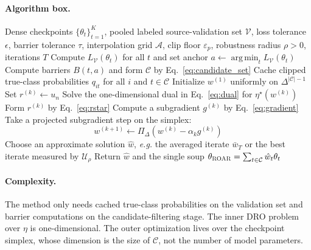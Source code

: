 \documentclass{article}
\newcommand{\cA}{\mathcal{A}}
\newcommand{\cC}{\mathcal{C}}
\newcommand{\cV}{\mathcal{V}}
\newcommand{\argmin}{\operatorname*{arg\,min}}
\newcommand{\simplex}{\Delta}
\newcommand{\eg}{\textit{e.g.}}
\newcommand{\roar}{\textup{\textsc{ROAR}}}
\begin{document}
\paragraph{Algorithm box.}
\begin{algorithm}[t]
    \caption{\roar{} (\textsc{Robust Optimization over Averageable Rashomon Sets})}
    \label{alg:roar}
    \begin{algorithmic}[1]
        \Require Dense checkpoints $\{\theta_t\}_{t=1}^{K}$, pooled labeled source-validation set $\cV$, loss tolerance $\epsilon$, barrier tolerance $\tau$, interpolation grid $\cA$, clip floor $\varepsilon_p$, robustness radius $\rho>0$, iterations $T$
        \State Compute $L_{\cV}(\theta_t)$ for all $t$ and set anchor $a\gets \argmin_t L_{\cV}(\theta_t)$
        \State Compute barriers $B(t,a)$ and form $\cC$ by Eq.~\eqref{eq:candidate_set}
        \State Cache clipped true-class probabilities $q_{it}$ for all $i$ and $t\in\cC$
        \State Initialize $w^{(1)}$ uniformly on $\simplex^{|\cC|-1}$
                \State Set $r^{(k)}\gets u_n$
            \Else
                \State Solve the one-dimensional dual in Eq.~\eqref{eq:dual} for $\eta^{\star}(w^{(k)})$
                \State Form $r^{(k)}$ by Eq.~\eqref{eq:rstar}
            \EndIf
            \State Compute a subgradient $g^{(k)}$ by Eq.~\eqref{eq:gradient}
            \State Take a projected subgradient step on the simplex:
            \[
                w^{(k+1)}
                \gets
                \Pi_{\simplex}\!\left(w^{(k)} - \alpha_k g^{(k)}\right)
            \]
        \EndFor
        \State Choose an approximate solution $\hat w$, \eg{} the averaged iterate $\bar w_T$ or the best iterate measured by $\mathcal U_{\rho}$
        \State Return $\hat w$ and the single soup $\theta_{\roar}=\sum_{t\in\cC} \hat w_t\theta_t$
    \end{algorithmic}
\end{algorithm}

\paragraph{Complexity.}
The method only needs cached true-class probabilities on the validation set and barrier computations on the candidate-filtering stage. The inner DRO problem over $\eta$ is one-dimensional. The outer optimization lives over the checkpoint simplex, whose dimension is the size of $\cC$, not the number of model parameters.
\end{document}
